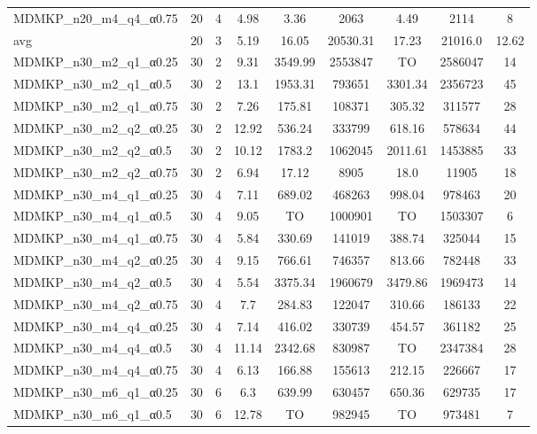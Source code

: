 \begin{table}[!ht]
{\begin{tabular}{lcccccccc}
MDMKP\_n20\_m4\_q4\_α0.75 & 20 & 4 & 4.98 &  \textcolor{blue2}{3.36} & 2063 & 4.49 & 2114 & 8 \\
\cline{1-9} avg & 20 & 3 & 5.19 & 16.05& 20530.31 & 17.23& 21016.0 & 12.62\\ \cline{1-9}
MDMKP\_n30\_m2\_q1\_α0.25 & 30 & 2 &  \textcolor{blue2}{9.31} & 3549.99 & 2553847 & TO & 2586047 & 14 \\
MDMKP\_n30\_m2\_q1\_α0.5 & 30 & 2 &  \textcolor{blue2}{13.1} & 1953.31 & 793651 & 3301.34 & 2356723 & 45 \\
MDMKP\_n30\_m2\_q1\_α0.75 & 30 & 2 &  \textcolor{blue2}{7.26} & 175.81 & 108371 & 305.32 & 311577 & 28 \\
MDMKP\_n30\_m2\_q2\_α0.25 & 30 & 2 &  \textcolor{blue2}{12.92} & 536.24 & 333799 & 618.16 & 578634 & 44 \\
MDMKP\_n30\_m2\_q2\_α0.5 & 30 & 2 &  \textcolor{blue2}{10.12} & 1783.2 & 1062045 & 2011.61 & 1453885 & 33 \\
MDMKP\_n30\_m2\_q2\_α0.75 & 30 & 2 &  \textcolor{blue2}{6.94} & 17.12 & 8905 & 18.0 & 11905 & 18 \\
MDMKP\_n30\_m4\_q1\_α0.25 & 30 & 4 &  \textcolor{blue2}{7.11} & 689.02 & 468263 & 998.04 & 978463 & 20 \\
MDMKP\_n30\_m4\_q1\_α0.5 & 30 & 4 &  \textcolor{blue2}{9.05} & TO & 1000901 & TO & 1503307 & 6 \\
MDMKP\_n30\_m4\_q1\_α0.75 & 30 & 4 &  \textcolor{blue2}{5.84} & 330.69 & 141019 & 388.74 & 325044 & 15 \\
MDMKP\_n30\_m4\_q2\_α0.25 & 30 & 4 &  \textcolor{blue2}{9.15} & 766.61 & 746357 & 813.66 & 782448 & 33 \\
MDMKP\_n30\_m4\_q2\_α0.5 & 30 & 4 &  \textcolor{blue2}{5.54} & 3375.34 & 1960679 & 3479.86 & 1969473 & 14 \\
MDMKP\_n30\_m4\_q2\_α0.75 & 30 & 4 &  \textcolor{blue2}{7.7} & 284.83 & 122047 & 310.66 & 186133 & 22 \\
MDMKP\_n30\_m4\_q4\_α0.25 & 30 & 4 &  \textcolor{blue2}{7.14} & 416.02 & 330739 & 454.57 & 361182 & 25 \\
MDMKP\_n30\_m4\_q4\_α0.5 & 30 & 4 &  \textcolor{blue2}{11.14} & 2342.68 & 830987 & TO & 2347384 & 28 \\
MDMKP\_n30\_m4\_q4\_α0.75 & 30 & 4 &  \textcolor{blue2}{6.13} & 166.88 & 155613 & 212.15 & 226667 & 17 \\
MDMKP\_n30\_m6\_q1\_α0.25 & 30 & 6 &  \textcolor{blue2}{6.3} & 639.99 & 630457 & 650.36 & 629735 & 17 \\
MDMKP\_n30\_m6\_q1\_α0.5 & 30 & 6 &  \textcolor{blue2}{12.78} & TO & 982945 & TO & 973481 & 7 \\

\end{tabular}}
\end{table}
